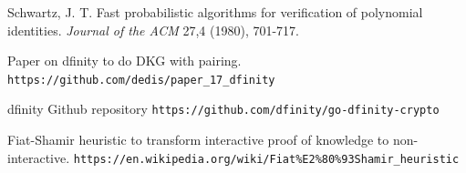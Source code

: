 \documentclass{article}
\begin{document}
\begin{thebibliography}{9}
Schwartz, J. T. Fast probabilistic algorithms for verification of polynomial identities. \textit{Journal of the ACM} 27,4 (1980), 701-717.


Paper on dfinity to do DKG with pairing.
\texttt{https://github.com/dedis/paper\_17\_dfinity}

dfinity Github repository
\texttt{https://github.com/dfinity/go-dfinity-crypto}

Fiat-Shamir heuristic to transform interactive proof of knowledge to non-interactive.
\texttt{https://en.wikipedia.org/wiki/Fiat\%E2\%80\%93Shamir\_heuristic}
\end{thebibliography}
\end{document}

